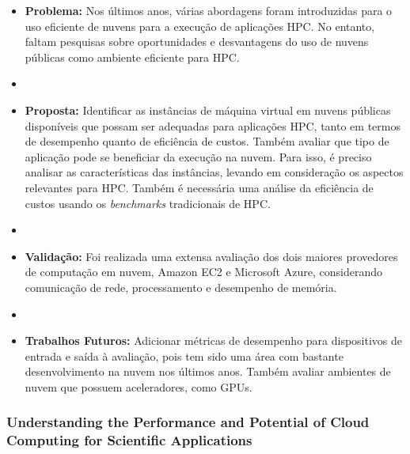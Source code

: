 \documentclass[tese,capa]{texufpel}
\begin{document}
\begin{itemize}[label={},noitemsep]
  \item \textbf{Problema:} Nos últimos anos, várias abordagens foram introduzidas para o uso eficiente de nuvens para a execução de aplicações HPC. No entanto, faltam pesquisas sobre oportunidades e desvantagens do uso de nuvens públicas como ambiente eficiente para HPC.
  \item 
  \item \textbf{Proposta:} Identificar as instâncias de máquina virtual em nuvens públicas disponíveis que possam ser adequadas para aplicações HPC, tanto em termos de desempenho quanto de eficiência de custos. Também avaliar que tipo de aplicação pode se beneficiar da execução na nuvem. Para isso, é preciso analisar as características das instâncias, levando em consideração os aspectos relevantes para HPC. Também é necessária uma análise da eficiência de custos usando os \textit{benchmarks} tradicionais de HPC.
  \item 
  \item \textbf{Validação:} Foi realizada uma extensa avaliação dos dois maiores provedores de computação em nuvem, Amazon EC2 e Microsoft Azure, considerando comunicação de rede, processamento e desempenho de memória.
  \item 
  \item \textbf{Trabalhos Futuros:} Adicionar métricas de desempenho para dispositivos de entrada e saída à avaliação, pois tem sido uma área com bastante desenvolvimento na nuvem nos últimos anos. Também avaliar ambientes de nuvem que possuem aceleradores, como GPUs. 
\end{itemize}

\subsubsection{Understanding the Performance and Potential of Cloud Computing for Scientific Applications \cite{sadooghiUnderstandingPerformancePotential2017d}}
\end{document}
